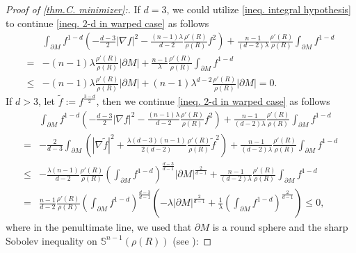 \documentclass[12pt]{amsart}%
\numberwithin{equation}{section}
\numberwithin{lemma}{section}
\numberwithin{proposition}{section}
\numberwithin{corollary}{section}
\numberwithin{remark}{section}
\begin{document}
\begin{proof}[Proof of \cref{thm.C. minimizer}:]
        If $d=3$, we could utilize \cref{ineq. integral hypothesis} to  continue \cref{ineq. 2-d in warped case} as follows
        \begin{align*}
            &\int_{\partial M}
            f^{1-d}\left(-\frac{d-3}{2}|\nabla f|^2
            -\frac{(n-1)\lambda}{d-2}\frac{\rho'(R)}{\rho(R)}
            f^2\right)
            +\frac{n-1}{(d-2)\lambda}
            \frac{\rho'(R)}{\rho(R)}
            \int_{\partial M} f^{1-d}\\
            =&-(n-1)\lambda\frac{\rho'(R)}{\rho(R)}
            |\partial M|
            +\frac{n-1}{\lambda}\frac{\rho'(R)}{\rho(R)}\int_{\partial M}f^{1-d}\\
            \leq &-(n-1)\lambda\frac{\rho'(R)}{\rho(R)}
            |\partial M|
            +(n-1)\lambda^{d-2}\frac{\rho'(R)}{\rho(R)}|\partial M|=0.
        \end{align*}
        If $d>3$, let $\tilde{f}:=f^{\frac{3-d}{2}} $, then we continue \cref{ineq. 2-d in warped case} as follows
        \begin{align*}
            &\int_{\partial M}
            f^{1-d}\left(-\frac{d-3}{2}|\nabla f|^2
            -\frac{(n-1)\lambda}{d-2}\frac{\rho'(R)}{\rho(R)}f^2\right)
            +\frac{n-1}{(d-2)\lambda}
            \frac{\rho'(R)}{\rho(R)}
            \int_{\partial M} f^{1-d}\\
            =&-\frac{2}{d-3}
            \int_{\partial M}
            \left(|\nabla \tilde{f}|^2
            +\frac{\lambda(d-3)(n-1)}{2(d-2)}\frac{\rho'(R)}{\rho(R)}
            \tilde{f}^2\right)
            +\frac{n-1}{(d-2)\lambda}
            \frac{\rho'(R)}{\rho(R)}
            \int_{\partial M} f^{1-d}\\
            \leq &
            -\frac{\lambda(n-1)}{d-2}
            \frac{\rho'(R)}{\rho(R)}
            \left(\int_{\partial M}f^{1-d}\right)^{\frac{d-3}{d-1}}
            |\partial M|^{\frac{2}{d-1}}
            +\frac{n-1}{(d-2)\lambda}
            \frac{\rho'(R)}{\rho(R)}
            \int_{\partial M} f^{1-d}\\
            =&\frac{n-1}{d-2}\frac{\rho'(R)}{\rho(R)}
            \left(\int_{\partial M}f^{1-d}\right)^{\frac{d-3}{d-1}}
            \left(
            -\lambda|\partial M|^{\frac{2}{d-1}}
            +\frac{1}{\lambda}
            \left(\int_{\partial M}
            f^{1-d}\right)^{\frac{2}{d-1}}
            \right)\leq 0,
        \end{align*}
        where in the penultimate line,  we used that $\partial M$ is a round sphere  and the sharp Sobolev inequality on $\mathbb{S}^{n-1}(\rho(R))$ (see \cite[Corollary 6.2]{BVV91}):

\end{proof}
\end{document}
